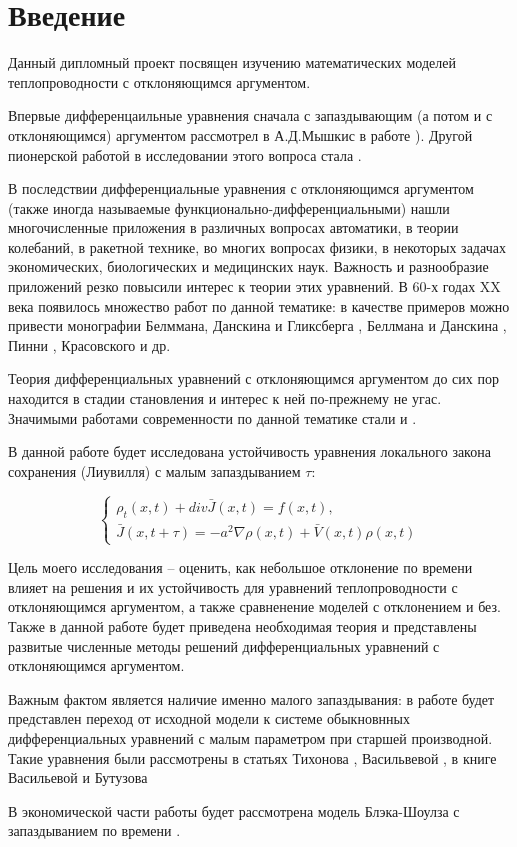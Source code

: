 \section*{Введение}

Данный дипломный проект посвящен изучению математических моделей теплопроводности с отклоняющимся аргументом. 

Впервые дифференцаильные уравнения сначала с запаздывающим (а потом и с отклоняющимся) аргументом рассмотрел в А.Д.Мышкис в работе \cite{bib:Myshkis-main}). Другой пионерской работой в исследовании этого вопроса стала \cite{bib:Hahn}.

В последствии дифференциальные уравнения с отклоняющимся аргументом (также иногда называемые функционально-дифференциальными) нашли многочисленные приложения в различных вопросах автоматики, в теории колебаний, в ракетной технике, во многих вопросах физики, в некоторых задачах экономических, биологических и медицинских наук. Важность и разнообразие приложений резко повысили интерес к теории этих уравнений. В 60-х годах XX века появилось множество работ по данной тематике: в качестве примеров можно привести монографии Белммана, Данскина и Гликсберга \cite{bib:Bellman-co}, Беллмана и Данскина \cite{bib:Bellman-Danskin}, Пинни \cite{bib:Pinny}, Красовского \cite{bib:Krasovskii} и др.

Теория дифференциальных уравнений с отклоняющимся аргументом до сих пор находится в стадии становления и интерес к ней по-прежнему не угас. Значимыми работами современности по данной тематике стали \cite{bib:Wu} и \cite{bib:Kolmanovskii-Myshkis}.

В данной работе будет исследована устойчивость уравнения локального закона сохранения (Лиувилля) с малым запаздыванием $\tau$:

\begin{equation*}
\left\{
\begin{aligned}
\rho_t(x,t) + div \bar{J}(x,t) = f(x,t),\\
\bar{J}(x,t+\tau) = -a^2 \nabla \rho(x,t) + \bar{V}(x,t) \rho(x,t)
\end{aligned}
\right.
\end{equation*}

Цель моего исследования \--- оценить, как небольшое отклонение по времени влияет на решения и их устойчивость для уравнений теплопроводности с отклоняющимся аргументом, а также сравненение моделей с отклонением и без. Также в данной работе будет приведена необходимая теория и представлены развитые численные методы решений дифференциальных уравнений с отклоняющимся аргументом.

Важным фактом является наличие именно малого запаздывания: в работе будет представлен переход от исходной модели к системе обыкновнных дифференциальных уравнений с малым параметром при старшей производной. Такие уравнения были рассмотрены в статьях Тихонова \cite{bib:Tikhonov_1, bib:Tikhonov_2}, Васильвевой \cite{bib:Vasilieva}, в книге Васильевой и Бутузова \cite{bib:Vasilieva-Butuzov}

В экономической части работы будет рассмотрена модель Блэка-Шоулза с запаздыванием по времени \cite{bib:Black-Scholes}.